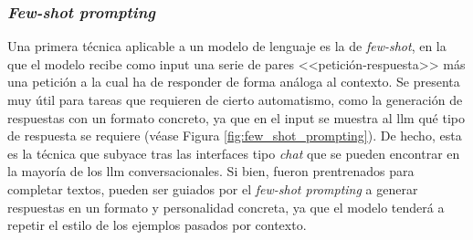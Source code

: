 \subsubsection{\emph{Few-shot prompting}}
\label{sec:few_shot_prompting}

Una primera técnica aplicable a un modelo de lenguaje es la de \emph{few-shot}, en la que el modelo recibe como input una serie de pares <<petición-respuesta>> más una petición a la cual ha de responder de forma análoga al contexto. Se presenta muy útil para tareas que requieren de cierto automatismo, como la generación de respuestas con un formato concreto, ya que en el input se muestra al \gls{llm} qué tipo de respuesta se requiere (véase Figura \ref{fig:few_shot_prompting}). De hecho, esta es la técnica que subyace tras las interfaces tipo \emph{chat} que se pueden encontrar en la mayoría de los \gls{llm} conversacionales. Si bien, fueron prentrenados para completar textos, pueden ser guiados por el \emph{few-shot prompting} a generar respuestas en un formato y personalidad concreta, ya que el modelo tenderá a repetir el estilo de los ejemplos pasados por contexto.



